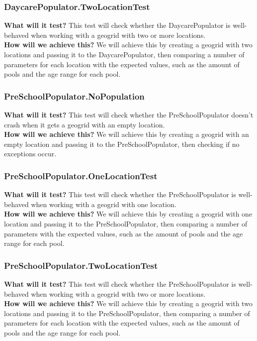\documentclass{article}
\begin{document}
\subsubsection{DaycarePopulator.TwoLocationTest}
\textbf{What will it test?}
This test will check whether the DaycarePopulator is well-behaved when working with a geogrid with two or more locations. \\
\newline
\textbf{How will we achieve this?}
We will achieve this by creating a geogrid with two locations and passing it to the DaycarePopulator, then comparing a number of parameters for each location with the expected values, such as the amount of pools and the age range for each pool.

\subsubsection{PreSchoolPopulator.NoPopulation}
\textbf{What will it test?}
This test will check whether the PreSchoolPopulator doesn't crash when it gets  a geogrid with an empty location. \\
\newline
\textbf{How will we achieve this?}
We will achieve this by creating a geogrid with an empty location and passing it to the PreSchoolPopulator, then checking if no exceptions occur.

\subsubsection{PreSchoolPopulator.OneLocationTest}
\textbf{What will it test?}
This test will check whether the PreSchoolPopulator is well-behaved when working with a geogrid with one location. \\
\newline
\textbf{How will we achieve this?}
We will achieve this by creating a geogrid with one location and passing it to the PreSchoolPopulator, then comparing a number of parameters with the expected values, such as the amount of pools and the age range for each pool.

\subsubsection{PreSchoolPopulator.TwoLocationTest}
\textbf{What will it test?}
This test will check whether the PreSchoolPopulator is well-behaved when working with a geogrid with two or more locations. \\
\newline
\textbf{How will we achieve this?}
We will achieve this by creating a geogrid with two locations and passing it to the PreSchoolPopulator, then comparing a number of parameters for each location with the expected values, such as the amount of pools and the age range for each pool.
\end{document}
